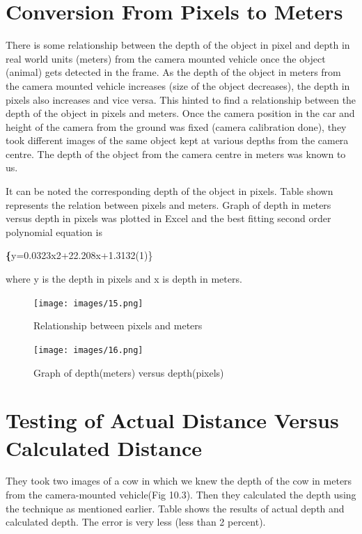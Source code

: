 \documentclass[14pt,a4paper,final]{extreport}
\begin{document}
\chapter{Conversion From Pixels to Meters}
\item There is some relationship between the depth of the object in pixel and depth in real world units (meters) from the camera mounted vehicle once the object (animal) gets detected in the frame. As the depth of the object in meters from the camera mounted vehicle increases (size of the object decreases), the depth in pixels also increases and vice versa. This hinted to find a relationship between the depth of the object in pixels and meters. Once the camera position in the car and height of the camera from the ground was fixed (camera calibration done), they took different images of the same object kept at various depths from the camera centre. The depth of the object from the camera centre in meters was known to us.
\item It can be noted the corresponding depth of the object in pixels. Table shown represents the relation between pixels and meters. Graph of depth in meters versus depth in pixels was plotted in Excel  and the best fitting second order polynomial equation is
\newline\item \textbf \{y=0.0323x2+22.208x+1.3132(1)\}
\newline \item where y is the depth in pixels and x is depth in meters.
\newline
\newline

\begin{figure}[h]
	\begin{center}
		\texttt{[image: images/15.png]}
		\vspace{.1 cm}
		\caption[Relationship between pixels and meters]{Relationship between pixels and meters}
	\end{center}
\end{figure}

\begin{figure}[h]
	\begin{center}
		\texttt{[image: images/16.png]}
		\vspace{.1 cm}
		\caption[Graph of depth(meters) versus depth(pixels)]{Graph of depth(meters) versus depth(pixels)}
	\end{center}
\end{figure}


\chapter{Testing of Actual Distance Versus Calculated Distance}
\item They took two images of a cow in which we knew the depth of the cow in meters from the camera-mounted vehicle(Fig 10.3). Then they calculated the depth using the technique as mentioned earlier. Table shows the results of actual depth and calculated depth. The error is very less (less than 2 percent).
\end{document}
